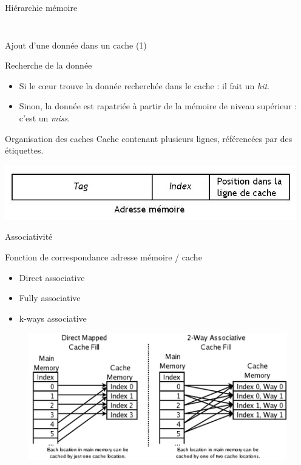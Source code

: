 \begin{frame}{Hiérarchie mémoire}
\begin{columns}[c]
\begin{column}{.4\textwidth}
\begin{figure}[h!]
      \end{figure}
    \end{column}
  \end{columns}
\end{frame}

\begin{frame}{Ajout d'une donnée dans un cache (1)}  
  \begin{block}{Recherche de la donnée}
    \begin{itemize}
    \item{Si le c\oe ur trouve la donnée recherchée dans le cache : il fait un \emph{hit}.}
    \item{Sinon, la donnée est rapatriée à partir de la mémoire de niveau supérieur : c'est un \emph{miss}.}
    \end{itemize}
  \end{block}

  \begin{block}{Organisation des caches}
    Cache contenant plusieurs lignes, référencées par des étiquettes.
  \end{block}
  \begin{center}
  \includegraphics[scale=.35]{images/etiquette.jpeg}
  \end{center}
\end{frame}	

\begin{frame}{Associativité}
  \begin{block}{Fonction de correspondance adresse mémoire / cache}
    \begin{itemize}
    \item{Direct associative}
    \item{Fully associative}
    \item{k-ways associative}
    \end{itemize}
  \end{block}
  \begin{figure}[h!]
    \includegraphics[scale=.33]{images/associative.png}
  \end{figure}
\end{frame}

